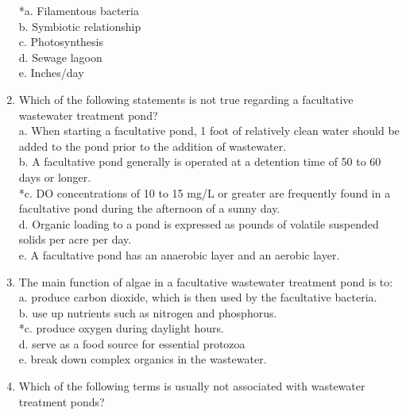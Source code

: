\begin{enumerate}
*a. Filamentous bacteria \\

b. Symbiotic relationship \\

c. Photosynthesis \\

d. Sewage lagoon \\

e. Inches/day \\


\item  Which of the following statements is not true regarding a facultative wastewater treatment pond? \\


a. When starting a facultative pond, 1 foot of relatively clean water should be added to the pond prior to the addition of wastewater. \\

b. A facultative pond generally is operated at a detention time of 50 to 60 days or longer. \\

*c. DO concentrations of 10 to 15 mg/L or greater are frequently found in a facultative pond during the afternoon of a sunny day. \\

d. Organic loading to a pond is expressed as pounds of volatile suspended solids per acre per day. \\

e. A facultative pond has an anaerobic layer and an aerobic layer. \\


\item  The main function of algae in a facultative wastewater treatment pond is to: \\


a. produce carbon dioxide, which is then used by the facultative bacteria. \\

b. use up nutrients such as nitrogen and phosphorus. \\

*c. produce oxygen during daylight hours. \\

d. serve as a food source for essential protozoa \\

e. break down complex organics in the wastewater. \\


\item  Which of the following terms is usually not associated with wastewater treatment ponds? \\



\end{enumerate}
